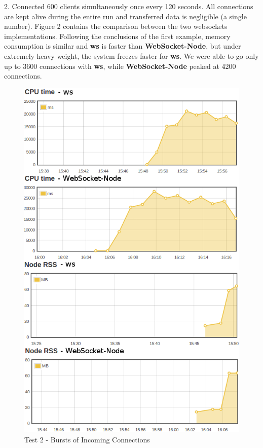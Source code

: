 \documentclass[conference]{IEEEtran}
\begin{document}
2. Connected 600 clients simultaneously once every 120 seconds. All connections are
kept alive during the entire run and transferred data is negligible (a single number).
Figure 2 contains the comparison between the two websockets implementations.
Following the conclusions of the first example, memory consumption is similar and
\textbf{ws} is faster than \textbf{WebSocket-Node}, but under extremely heavy weight,
the system freezes faster for \textbf{ws}. We were able to go only up to 3600 connections with \textbf{ws}, while \textbf{WebSocket-Node} peaked at 4200 connections.
\begin{frame}{}
  \begin{figure}
    \centering
	\includegraphics[width=1\linewidth]{img/test2v2.png}
    \caption{Test 2 - Bursts of Incoming Connections}
  \end{figure}
\end{frame}
\\
\end{document}
